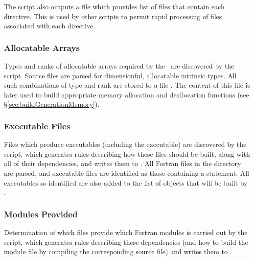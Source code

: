 The script also outputs a file  which provides list of files that contain each directive. This is used by other scripts to permit rapid processing of files associated with each directive.

\subsubsection{Allocatable Arrays}\label{sec:buildDiscoverAllocatables}

Types and ranks of allocatable arrays required by the \glc\ are discovered by the  script. Source files are parsed for dimensionful, allocatable intrinsic types. All such combinations of type and rank are stored to a file . The content of this file is later used to build appropriate memory allocation and deallocation functions (see \S\ref{sec:buildGenerationMemory}).

\subsubsection{Executable Files}\label{sec:buildExecutables}

Files which produce executables (including the  executable) are discovered by the  script, which generates rules describing how these files should be built, along with all of their dependencies, and writes them to . All Fortran files in the  directory are parsed, and executable files are identified as those containing a  statement. All executables so identified are also added to the list of objects that will be built by .

\subsubsection{Modules Provided}\label{sec:buildModulesProvided}

Determination of which files provide which Fortran modules is carried out by the  script, which generates rules describing these dependencies (and how to build the module file by compiling the corresponding source file) and writes them to .

